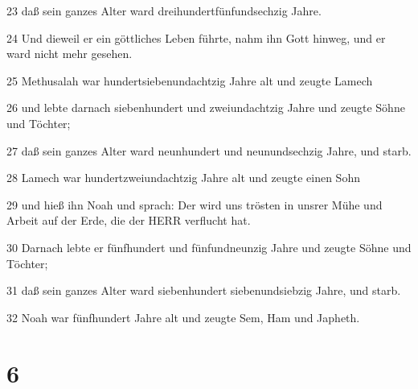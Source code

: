 \par 23 daß sein ganzes Alter ward dreihundertfünfundsechzig Jahre.
\par 24 Und dieweil er ein göttliches Leben führte, nahm ihn Gott hinweg, und er ward nicht mehr gesehen.
\par 25 Methusalah war hundertsiebenundachtzig Jahre alt und zeugte Lamech
\par 26 und lebte darnach siebenhundert und zweiundachtzig Jahre und zeugte Söhne und Töchter;
\par 27 daß sein ganzes Alter ward neunhundert und neunundsechzig Jahre, und starb.
\par 28 Lamech war hundertzweiundachtzig Jahre alt und zeugte einen Sohn
\par 29 und hieß ihn Noah und sprach: Der wird uns trösten in unsrer Mühe und Arbeit auf der Erde, die der HERR verflucht hat.
\par 30 Darnach lebte er fünfhundert und fünfundneunzig Jahre und zeugte Söhne und Töchter;
\par 31 daß sein ganzes Alter ward siebenhundert siebenundsiebzig Jahre, und starb.
\par 32 Noah war fünfhundert Jahre alt und zeugte Sem, Ham und Japheth.

\chapter{6}


